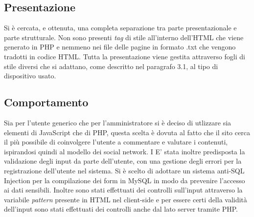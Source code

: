 \subsection{Presentazione}
Si è cercata, e ottenuta, una completa separazione tra parte presentazionale e parte strutturale. Non sono presenti \textit{tag} di stile all’interno dell'HTML che viene generato in PHP e nemmeno nei file delle pagine in formato .txt che vengono tradotti in codice HTML. 
Tutta la presentazione viene gestita attraverso fogli di stile diversi che si adattano, come descritto nel paragrafo 3.1, al tipo di dispositivo usato.

\subsection{Comportamento}
Sia per l'utente generico che per l'amministratore si è deciso di utlizzare sia elementi di JavaScript che di PHP, questa scelta è dovuta al fatto che il sito cerca il più possibile di coinvolgere l'utente a commentare e valutare i contenuti, ispirandosi quindi al modello dei social network. I
E' stata inoltre predisposta la validazione degli input da parte dell’utente, con una gestione degli errori per la registrazione dell'utente nel sistema. Si è scelto di adottare un sistema anti-SQL Injection per la compilazione dei form in MySQL in modo da prevenire l'accesso ai dati sensibili. Inoltre sono stati effettuati dei controlli sull'input attraverso la variabile \textit{pattern} presente in HTML nel client-side e per essere certi della validità dell'input sono stati effettuati dei controlli anche dal lato server tramite PHP.


